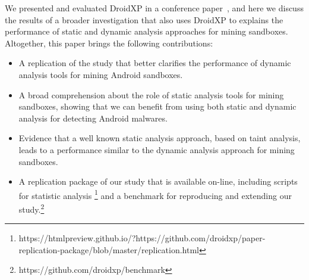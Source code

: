 We presented and evaluated DroidXP in a conference paper~\cite{DBLP:conf/scam/CostaMCMVBC20},
and here we discuss the results of a broader investigation
that also uses DroidXP to explains the performance of static and dynamic analysis
approaches for mining sandboxes. Altogether, this paper brings the following contributions:

\begin{itemize}
\item A replication of the \blls study that better clarifies the performance of
  dynamic analysis tools for mining Android sandboxes.

\item A broad comprehension about the role of static analysis tools for mining
  sandboxes, showing that we can benefit from using both static and dynamic
  analysis for detecting Android malwares.

\item Evidence that a well known static analysis approach, based on
  taint analysis, leads to a performance similar to the dynamic analysis
  approach for mining sandboxes.

\item A replication package of our study that is available on-line, including
  scripts for statistic analysis \footnote{https://htmlpreview.github.io/?https://github.com/droidxp/paper-replication-package/blob/master/replication.html}
  and a benchmark for reproducing and extending our study.\footnote{https://github.com/droidxp/benchmark} 
\end{itemize}




 
